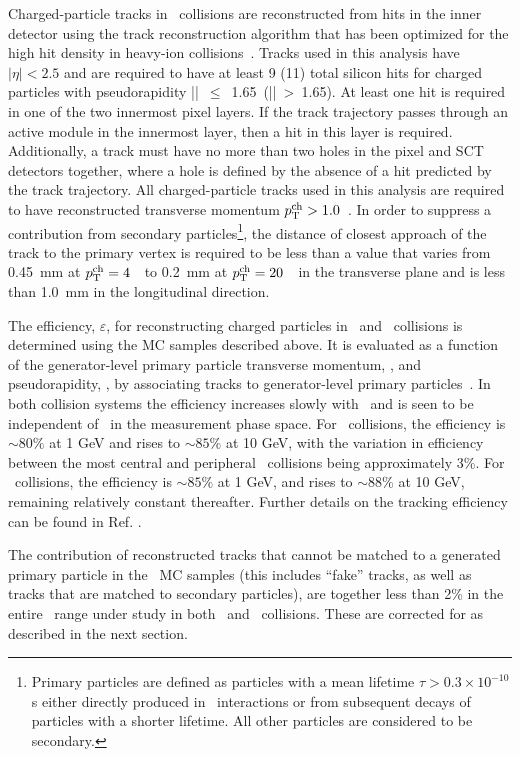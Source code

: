 Charged-particle tracks in \pbpb\ collisions are reconstructed from hits in the inner detector using the 
track reconstruction algorithm that has been optimized for the high hit density in heavy-ion
collisions~\cite{Aaboud:2017all}.
Tracks used in this analysis have $|\eta| < 2.5$ and are required to have at least 9 (11) total silicon hits for charged particles with pseudorapidity \mbox{|\etatrk| $\leq$ 1.65 (|\etatrk| > 1.65)}.  At least one hit is required in one of the two innermost pixel layers.
If the track trajectory passes through an active module in the innermost layer, then 
a hit in this layer is required. Additionally, a track must 
have no more than two holes in the pixel and SCT detectors together, where 
a hole is defined by the absence of a hit predicted by the track 
trajectory. 
All charged-particle tracks used in this analysis are required to have reconstructed transverse momentum $\mbox{$p_{\mathrm{T}}^{\mathrm{ch}}$} > 1.0 $~\GeV. In order to suppress a contribution from
secondary particles\footnote{Primary particles are defined as particles with a mean lifetime $\tau>0.3\times 10^{-10}$ s either directly produced in \pp\ interactions or from subsequent decays of particles with a shorter lifetime. All other particles are considered to be secondary.}, the distance of closest approach of the track to the primary vertex is required to be less than a value that varies from 0.45~mm at $\mbox{$p_{\mathrm{T}}^{\mathrm{ch}}$}=4$~\GeV\ to 0.2~mm at $\mbox{$p_{\mathrm{T}}^{\mathrm{ch}}$}=20$~\GeV\ in the transverse plane and is less than 1.0~mm in the longitudinal direction.


The efficiency, $\varepsilon$, for reconstructing charged particles in \PbPb\ and \pp\ collisions is determined using the MC samples described above. It is evaluated as a function of the generator-level primary particle transverse momentum, \pTtrue, and pseudorapidity, \etatrue, by associating tracks to generator-level primary particles~\cite{Aad:2010ah}. In both collision systems the efficiency increases slowly with \pTtrue\ and is seen to be independent of \ptjet\ in the measurement phase space. For \pbpb\ collisions, the efficiency is $\sim 80\%$ at 1 GeV and rises to $\sim 85\%$ at 10 GeV, with the variation in efficiency between the most central and peripheral \pbpb\ collisions being approximately 3\%. For \pp\ collisions, the efficiency is $\sim85\%$ at 1 GeV, and rises to $\sim 88 \%$ at 10 GeV, remaining relatively constant thereafter. Further details on the tracking efficiency can be found in Ref. \cite{Aaboud:2017bzv}. 

The contribution of reconstructed tracks that cannot be matched to a generated primary particle in the \pp\ MC samples (this includes ``fake'' tracks, as well as tracks that are matched to secondary particles), are together less than 2\% in the entire \pttrk\ range under study in both \pp\ and \pbpb\ collisions.  These are corrected for as described in the next section.








